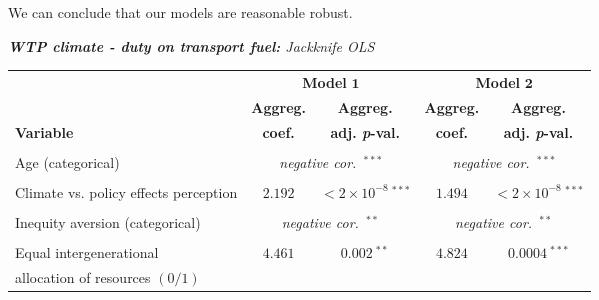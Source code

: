 \documentclass[a4paper,12pt]{article}
\begin{document}
We can conclude that our models are reasonable robust.

{\centering
\begin{threeparttable}
\singlespacing
\caption{\textit{\textbf{\vspace{-0.6cm} WTP climate - duty on transport fuel:} Jackknife OLS}}
\label{FuelInOut} 
\centering
\begin{small}
\vspace{-0.8cm}
\begin{tabular}{lcccc} 
\\
\hline
  \multicolumn{1}{l}{}&\multicolumn{2}{c}{\textbf{Model} $\boldsymbol{1}$}%
  &\multicolumn{2}{c}{\textbf{Model} $\boldsymbol{2}$}\\%
\cmidrule(lr){2-3} \cmidrule(lr){4-5}
  \multicolumn{1}{l}{} & \multicolumn{1}{c}{\textbf{Aggreg.}}& \multicolumn{1}{c}{\textbf{Aggreg.}}& \multicolumn{1}{c}{\textbf{Aggreg.}} &  \multicolumn{1}{c}{\textbf{Aggreg.}} \\
 \multicolumn{1}{l}{\textbf{Variable}} & \multicolumn{1}{c}{\textbf{coef.}}& \multicolumn{1}{c}{\textbf{adj. \textit{p}-val.}}& \multicolumn{1}{c}{\textbf{coef.}} &  \multicolumn{1}{c}{\textbf{adj. \textit{p}-val.}} \\
\hline  \vspace{-0.32cm} 
\\ 
\vspace{-0.32cm}Age (categorical)\tnote{a}&\multicolumn{2}{c}{\textit{negative cor.~}$^{***}$}&\multicolumn{2}{c}{\textit{negative cor.~}$^{***}$}\\
  \\
\vspace{-0.32cm}Climate vs. policy effects perception&$2.192$&$<2\times10^{-8}~^{***}$&$1.494$&$<2\times10^{-8}~^{***}$\\
  \\
  \vspace{-0.32cm}Inequity aversion (categorical)\tnote{a}&\multicolumn{2}{c}{\textit{negative cor.~}$^{**}$}&\multicolumn{2}{c}{\textit{negative cor.~}$^{**}$}\\
      \\
 Equal intergenerational&\multirow{2}{*}{$4.461$}&\multirow{2}{*}{${0.002}~^{**}$}&\multirow{2}{*}{$4.824$}&\multirow{2}{*}{${0.0004}~^{***}$}\\
\vspace{-0.32cm}\hspace{0.6cm}allocation of resources $(0/1)$&\\

\end{tabular}
\end{small}
\end{threeparttable}}
\end{document}
